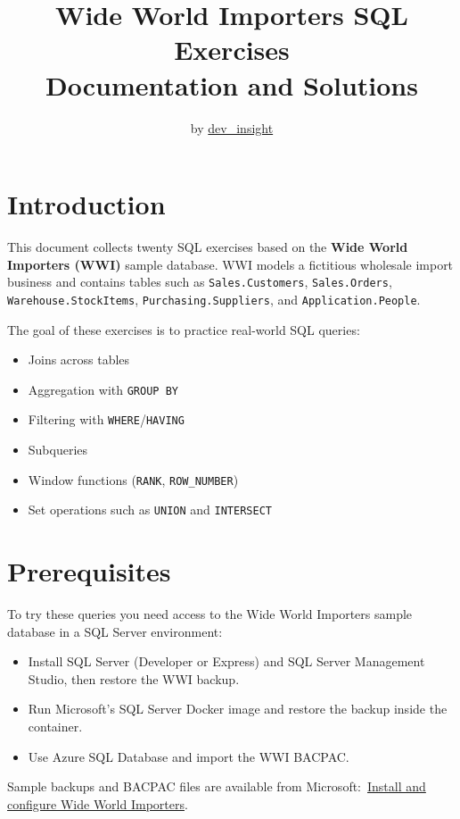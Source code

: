 \documentclass[12pt,a4paper]{article}
\title{Wide World Importers SQL Exercises \\ \large Documentation and Solutions}
\author{ {\large by \href{https://github.com/konradcinkusz}{\faGithub\;dev\_insight}}}
\begin{document}
\maketitle

\tableofcontents
\newpage

\section*{Introduction}
This document collects twenty SQL exercises based on the \textbf{Wide World Importers (WWI)} sample database.
WWI models a fictitious wholesale import business and contains tables such as \texttt{Sales.Customers}, \texttt{Sales.Orders},
\texttt{Warehouse.StockItems}, \texttt{Purchasing.Suppliers}, and \texttt{Application.People}.

The goal of these exercises is to practice real-world SQL queries:
\begin{itemize}
    \item Joins across tables
    \item Aggregation with \texttt{GROUP BY}
    \item Filtering with \texttt{WHERE}/\texttt{HAVING}
    \item Subqueries
    \item Window functions (\texttt{RANK}, \texttt{ROW\_NUMBER})
    \item Set operations such as \texttt{UNION} and \texttt{INTERSECT}
  \end{itemize}

  \section*{Prerequisites}
  To try these queries you need access to the Wide World Importers sample database in a SQL Server environment:
  \begin{itemize}
      \item Install SQL Server (Developer or Express) and SQL Server Management Studio, then restore the WWI backup.
      \item Run Microsoft's SQL Server Docker image and restore the backup inside the container.
      \item Use Azure SQL Database and import the WWI BACPAC.
  \end{itemize}
  \noindent Sample backups and BACPAC files are available from Microsoft:\
  \href{https://learn.microsoft.com/en-us/sql/samples/wide-world-importers-oltp-install-configure}{Install and configure Wide World Importers}.
\end{document}
